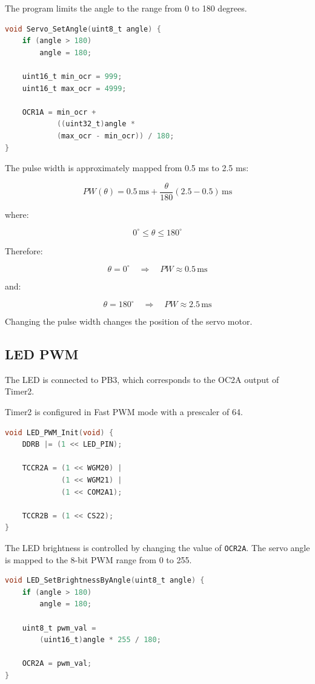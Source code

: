 \documentclass[12pt,a4paper]{article}
\begin{document}
The program limits the angle to the range from 0 to 180 degrees.

\begin{lstlisting}[language=C]
void Servo_SetAngle(uint8_t angle) {
    if (angle > 180)
        angle = 180;

    uint16_t min_ocr = 999;
    uint16_t max_ocr = 4999;

    OCR1A = min_ocr +
            ((uint32_t)angle *
            (max_ocr - min_ocr)) / 180;
}
\end{lstlisting}

The pulse width is approximately mapped from 0.5 ms to 2.5 ms:

\[
PW(\theta)
=
0.5\,\mathrm{ms}
+
\frac{\theta}{180}
(2.5-0.5)\,\mathrm{ms}
\]

where:

\[
0^\circ \leq \theta \leq 180^\circ
\]

Therefore:

\[
\theta = 0^\circ
\quad\Rightarrow\quad
PW \approx 0.5\,\mathrm{ms}
\]

and:

\[
\theta = 180^\circ
\quad\Rightarrow\quad
PW \approx 2.5\,\mathrm{ms}
\]

Changing the pulse width changes the position of the servo motor.

\subsection{LED PWM}

The LED is connected to PB3, which corresponds to the OC2A output of
Timer2.

Timer2 is configured in Fast PWM mode with a prescaler of 64.

\begin{lstlisting}[language=C]
void LED_PWM_Init(void) {
    DDRB |= (1 << LED_PIN);

    TCCR2A = (1 << WGM20) |
             (1 << WGM21) |
             (1 << COM2A1);

    TCCR2B = (1 << CS22);
}
\end{lstlisting}

The LED brightness is controlled by changing the value of
\texttt{OCR2A}. The servo angle is mapped to the 8-bit PWM range from
0 to 255.

\begin{lstlisting}[language=C]
void LED_SetBrightnessByAngle(uint8_t angle) {
    if (angle > 180)
        angle = 180;

    uint8_t pwm_val =
        (uint16_t)angle * 255 / 180;

    OCR2A = pwm_val;
}
\end{lstlisting}
\end{document}
